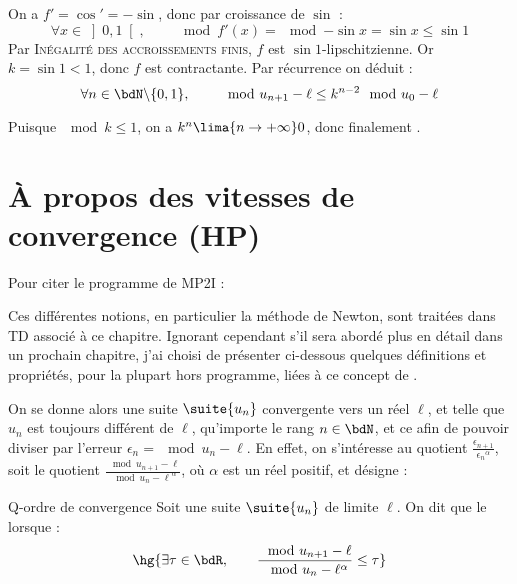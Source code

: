 \documentclass[a4paper,french,bookmarks]{article}
\begin{document}
\begin{example}{}{}
\begin{enumerate}
\begin{minipage}{0.5\linewidth}
                \ithand On a $f' = \cos' = -\sin$, donc par croissance de $\sin$ :
                \[ \forall x \in \left]0, 1\right[,\qquad \mod{f'(x)} = \mod{-\sin x} = \sin x \leq \sin{1}\]
                Par \textsc{Inégalité des accroissements finis}, $f$ est $\sin{1}$-lipschitzienne. Or $k = \sin{1} < 1$, donc $f$ est contractante. Par récurrence on déduit :
                \[ \forall n \in \bdN \backslash \{0, 1\},\qquad \mod{u_{n+1} - \ell} \leq k^{n-2}\mod{u_0 - \ell}\]
    \end{minipage}
    Puisque $\mod{k} \leq 1$, on a $k^n \lima{n \to +\infty} 0$, donc finalement .
    \end{enumerate}
\end{example}

\section{À propos des vitesses de convergence (HP)}

Pour citer le programme de \textsf{MP2I} :


Ces différentes notions, en particulier la méthode de Newton, sont traitées dans TD associé à ce chapitre. Ignorant cependant s'il sera abordé plus en détail dans un prochain chapitre, j'ai choisi de présenter ci-dessous quelques définitions et propriétés, pour la plupart hors programme, liées à ce concept de .

On se donne alors une suite $\suite{u_n}$ convergente vers un réel $\ell$, et telle que $u_n$ est toujours différent de $\ell$, qu'importe le rang $n \in \bdN$, et ce afin de pouvoir diviser par l'erreur $\epsilon_n = \mod{u_n - \ell}$. En effet, on s'intéresse au quotient $\frac{\epsilon_{n+1}}{{\epsilon_n}^\alpha}$, soit le quotient $\frac{\mod{u_{n+1} - \ell}}{\mod{u_n - \ell}^\alpha}$, où $\alpha$ est un réel positif, et désigne  :

\begin{definition}{Q-ordre de convergence}{}
    Soit une suite $\suite{u_n}$ de limite $\ell$. On dit que le  lorsque :
    \[ \hg{\exists \tau \in \bdR,\qquad \dfrac{\mod{u_{n+1} - \ell}}{\mod{u_n - \ell}^\alpha} \leq \tau}\]
\end{definition}
\end{document}
